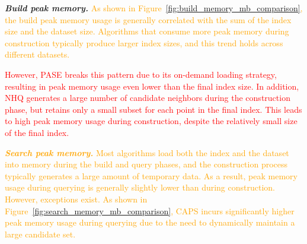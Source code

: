 \documentclass[sigconf, nonacm]{acmart}
\begin{document}
{%
\textit{\textbf{Build peak memory.}}
% 
 \textcolor{orange}{As shown in Figure~\ref{fig:build_memory_mb_comparison}, the build peak memory usage is generally correlated with the sum of the index size and the dataset size. Algorithms that consume more peak memory during construction typically produce larger index sizes, and this trend holds across different datasets.}

\textcolor{red}{However, PASE breaks this pattern due to its on-demand loading strategy, resulting in peak memory usage even lower than the final index size. 
In addition, NHQ generates a large number of candidate neighbors during the construction phase, but retains only a small subset for each point in the final index. This leads to high peak memory usage during construction, despite the relatively small size of the final index.}

 \textcolor{orange}{\textit{\textbf{Search peak memory.}}
Most algorithms load both the index and the dataset into memory during the build and query phases, and the construction process typically generates a large amount of temporary data. As a result, peak memory usage during querying is generally slightly lower than during construction. However, exceptions exist. As shown in Figure~\ref{fig:search_memory_mb_comparison}, CAPS incurs significantly higher peak memory usage during querying due to the need to dynamically maintain a large candidate set.}
	
}
\end{document}

